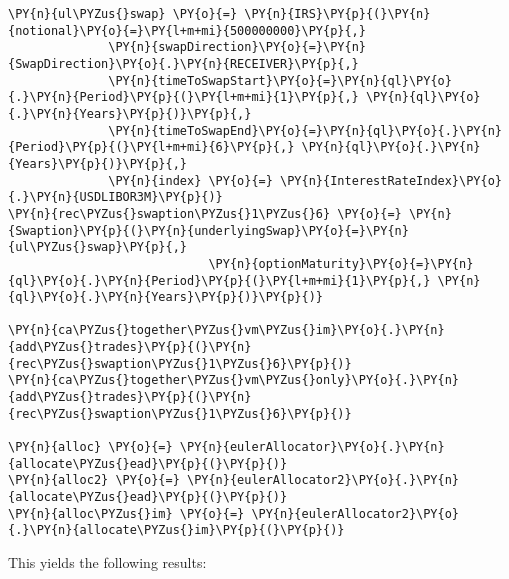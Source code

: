    \begin{tcolorbox}[breakable, size=fbox, boxrule=1pt, pad at break*=1mm,colback=cellbackground, colframe=cellborder]
\begin{Verbatim}[commandchars=\\\{\}]
\PY{n}{ul\PYZus{}swap} \PY{o}{=} \PY{n}{IRS}\PY{p}{(}\PY{n}{notional}\PY{o}{=}\PY{l+m+mi}{500000000}\PY{p}{,}
              \PY{n}{swapDirection}\PY{o}{=}\PY{n}{SwapDirection}\PY{o}{.}\PY{n}{RECEIVER}\PY{p}{,}
              \PY{n}{timeToSwapStart}\PY{o}{=}\PY{n}{ql}\PY{o}{.}\PY{n}{Period}\PY{p}{(}\PY{l+m+mi}{1}\PY{p}{,} \PY{n}{ql}\PY{o}{.}\PY{n}{Years}\PY{p}{)}\PY{p}{,}
              \PY{n}{timeToSwapEnd}\PY{o}{=}\PY{n}{ql}\PY{o}{.}\PY{n}{Period}\PY{p}{(}\PY{l+m+mi}{6}\PY{p}{,} \PY{n}{ql}\PY{o}{.}\PY{n}{Years}\PY{p}{)}\PY{p}{,}
              \PY{n}{index} \PY{o}{=} \PY{n}{InterestRateIndex}\PY{o}{.}\PY{n}{USDLIBOR3M}\PY{p}{)}
\PY{n}{rec\PYZus{}swaption\PYZus{}1\PYZus{}6} \PY{o}{=} \PY{n}{Swaption}\PY{p}{(}\PY{n}{underlyingSwap}\PY{o}{=}\PY{n}{ul\PYZus{}swap}\PY{p}{,}
                            \PY{n}{optionMaturity}\PY{o}{=}\PY{n}{ql}\PY{o}{.}\PY{n}{Period}\PY{p}{(}\PY{l+m+mi}{1}\PY{p}{,} \PY{n}{ql}\PY{o}{.}\PY{n}{Years}\PY{p}{)}\PY{p}{)}

\PY{n}{ca\PYZus{}together\PYZus{}vm\PYZus{}im}\PY{o}{.}\PY{n}{add\PYZus{}trades}\PY{p}{(}\PY{n}{rec\PYZus{}swaption\PYZus{}1\PYZus{}6}\PY{p}{)}
\PY{n}{ca\PYZus{}together\PYZus{}vm\PYZus{}only}\PY{o}{.}\PY{n}{add\PYZus{}trades}\PY{p}{(}\PY{n}{rec\PYZus{}swaption\PYZus{}1\PYZus{}6}\PY{p}{)}

\PY{n}{alloc} \PY{o}{=} \PY{n}{eulerAllocator}\PY{o}{.}\PY{n}{allocate\PYZus{}ead}\PY{p}{(}\PY{p}{)}
\PY{n}{alloc2} \PY{o}{=} \PY{n}{eulerAllocator2}\PY{o}{.}\PY{n}{allocate\PYZus{}ead}\PY{p}{(}\PY{p}{)}
\PY{n}{alloc\PYZus{}im} \PY{o}{=} \PY{n}{eulerAllocator2}\PY{o}{.}\PY{n}{allocate\PYZus{}im}\PY{p}{(}\PY{p}{)}
\end{Verbatim}
\end{tcolorbox}

    This yields the following results:

            \begin{tcolorbox}[breakable, size=fbox, boxrule=.5pt, pad at break*=1mm, opacityfill=0]
\begin{center}
    \end{center}
    { \hspace*{\fill} \\}
\end{tcolorbox}
        
